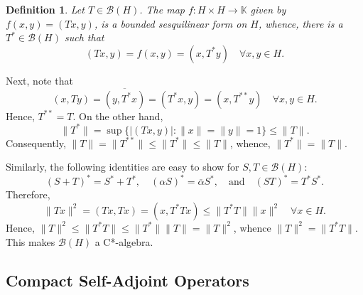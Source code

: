 \documentclass[12pt]{article}
\theoremstyle{thmstyle}
\theoremstyle{defstyle}
\newtheorem{definition}[theorem]{Definition}
\newcommand{\R}{\mathbb{R}}
\newcommand{\bbC}{\mathbb{C}}
\newcommand{\K}{\mathbb{K}} %
\newcommand{\scrB}{\mathscr B}
\renewcommand{\le}{\leqslant}
\begin{document}
\begin{definition}
    Let $T\in\scrB(H)$. The map $f: H\times H\to\K$ given by $f(x, y) = (Tx, y)$, is a bounded sesquilinear form on $H$, whence, there is a $T^\ast\in\scrB(H)$ such that 
    \begin{equation*}
        (Tx, y) = f(x, y) = (x, T^\ast y)\quad\forall x,y\in H.
    \end{equation*}
\end{definition}
Next, note that 
\begin{equation*}
    (x, Ty) = \overline{(y, T^\ast x)} = (T^\ast x, y) = (x, T^{\ast\ast}y)\quad\forall x, y\in H.
\end{equation*}
Hence, $T^{\ast\ast} = T$. On the other hand, 
\begin{equation*}
    \|T^\ast\| = \sup\{|(Tx, y)|\colon \|x\| = \|y\| = 1\}\le \|T\|.
\end{equation*}
Consequently, $\|T\| = \|T^{\ast\ast}\|\le\|T^{\ast}\|\le\|T\|$, whence, $\|T^\ast\| = \|T\|$.

Similarly, the following identities are easy to show for $S,T\in\scrB(H)$: 
\begin{equation*}
    (S + T)^\ast = S^\ast + T^\ast,\quad(\alpha S)^\ast = \overline\alpha S^\ast,\quad\text{and}\quad (ST)^\ast = T^\ast S^\ast.
\end{equation*}
Therefore, 
\begin{equation*}
    \|Tx\|^2 = (Tx, Tx) = (x, T^\ast Tx)\le \|T^\ast T\|\|x\|^2\quad\forall x\in H.
\end{equation*}
Hence, $\|T\|^2\le \|T^\ast T\|\le \|T^\ast\|\|T\| = \|T\|^2$, whence $\|T\|^2 = \|T^\ast T\|$. This makes $\scrB(H)$ a C*-algebra.

\subsection{Compact Self-Adjoint Operators}
\end{document}
